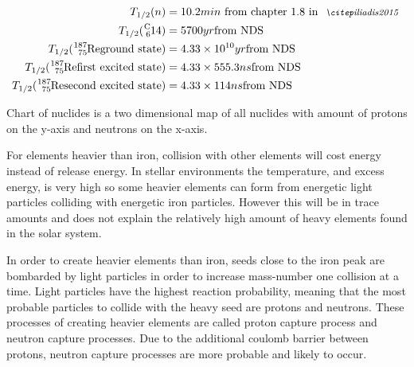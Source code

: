 \begin{align*}
  T_{1/2}(n) &= 10.2 min \textrm{\vspace{1cm} from chapter 1.8 in \mycite{iliadis2015}} \\
  T_{1/2}(\isotope{14}{6}{C}) &= 5700 yr \textrm{\vspace{1cm}from NDS} \\
  T_{1/2}(\re{187} \textrm{ground state}) &= 4.33 \times 10^{10} yr \textrm{\vspace{1cm}from NDS} \\
  T_{1/2}(\re{187} \textrm{first excited state}) &= 4.33 \times 555.3 ns \textrm{\vspace{1cm}from NDS} \\
  T_{1/2}(\re{187} \textrm{second excited state}) &= 4.33 \times 114 ns \textrm{\vspace{1cm}from NDS} \\
\end{align*}

Chart of nuclides is a two dimensional map of all nuclides with amount of protons on the y-axis and neutrons on the x-axis.



For elements heavier than iron, collision with other elements will cost energy instead of release energy.
In stellar environments the temperature, and excess energy, is very high so some heavier elements can form from
energetic light particles colliding with energetic iron particles. However this will be in trace amounts
and does not explain the relatively high amount of heavy elements found in the solar system.

In order to create heavier elements than iron, seeds close to the iron peak 
are bombarded by light particles in order to increase mass-number one collision at a time.
Light particles have the highest reaction probability, meaning that the most probable particles to collide with the heavy seed
are protons and neutrons.
These processes of creating heavier elements are called proton capture process and neutron capture processes.
Due to the additional coulomb barrier between protons, neutron capture processes are more probable and likely to occur.

